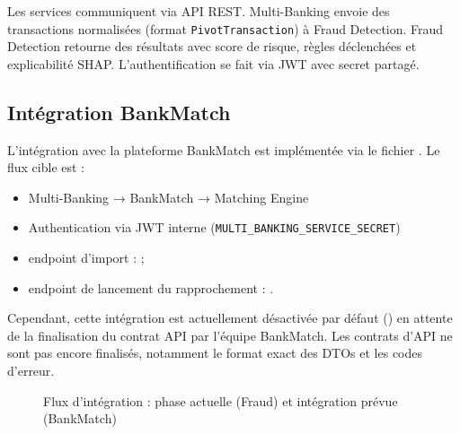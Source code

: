 \documentclass[12pt,a4paper]{extreport}
\begin{document}
Les services communiquent via API REST. Multi-Banking envoie des transactions normalisées (format \texttt{PivotTransaction}) à Fraud Detection. Fraud Detection retourne des résultats avec score de risque, règles déclenchées et explicabilité SHAP. L'authentification se fait via JWT avec secret partagé.

\subsection{Intégration BankMatch}

L'intégration avec la plateforme BankMatch est implémentée via le fichier . Le flux cible est :

\begin{itemize}
    \item Multi-Banking → BankMatch → Matching Engine
    \item Authentication via JWT interne (\texttt{MULTI\_BANKING\_SERVICE\_SECRET})
    \item endpoint d'import :  ;
    \item endpoint de lancement du rapprochement : .
\end{itemize}

Cependant, cette intégration est actuellement désactivée par défaut
() en attente de la finalisation du contrat API par l'équipe BankMatch. Les contrats d'API ne sont pas encore finalisés, notamment le format exact des DTOs et les codes d'erreur.

\begin{figure}[H]
\centering
{}
\caption{Flux d'intégration : phase actuelle (Fraud) et intégration prévue (BankMatch)}
\end{figure}
\end{document}
